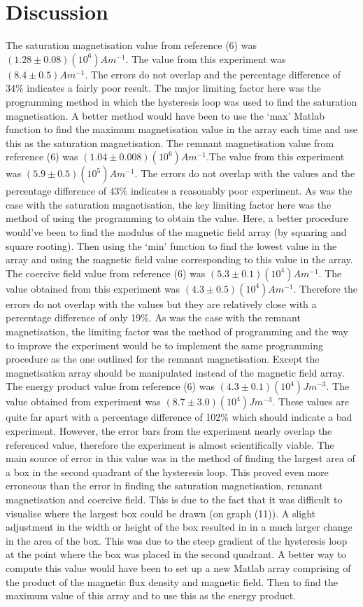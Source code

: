 \documentclass[a4paper]{article}\usepackage[english]{babel}
\begin{document}
\section{Discussion}
The saturation magnetisation value from reference (6) was $(1.28±0.08)(10^6)Am^{-1}$. The value from this experiment was $(8.4±0.5)Am^{-1}$. The errors do not overlap and the percentage difference of 34\% indicates a fairly poor result. The major limiting factor here was the programming method in which the hysteresis loop was used to find the saturation magnetisation. A better method would have been to use the ‘max’ Matlab function to find the maximum magnetisation value in the array each time and use this as the saturation magnetisation.
The remnant magnetisation value from reference (6) was $(1.04±0.008)(10^6)Am^{-1}$.The value from this experiment was $(5.9±0.5)(10^5)Am^{-1}$. The errors do not overlap with the values and the percentage difference of 43\% indicates a reasonably poor experiment. As was the case with the saturation magnetisation, the key limiting factor here was the method of using the programming to obtain the value. Here, a better procedure would’ve been to find the modulus of the magnetic field array (by squaring and square rooting). Then using the ‘min’ function to find the lowest value in the array and using the magnetic field value corresponding to this value in the array. 
The coercive field value from reference (6) was $(5.3±0.1)(10^4)Am^{-1}$. The value obtained from this experiment was $(4.3±0.5)(10^4)Am^{-1}$. Therefore the errors do not overlap with the values but they are relatively close with a percentage difference of only 19\%. As was the case with the remnant magnetisation, the limiting factor was the method of programming and the way to improve the experiment would be to implement the same programming procedure as the one outlined for the remnant magnetisation. Except the magnetisation array should be manipulated instead of the magnetic field array. 
The energy product value from reference (6) was $(4.3±0.1)(10^4)Jm^{-3}$. The value obtained from experiment was $(8.7±3.0)(10^4)Jm^{-3}$. These values are quite far apart with a percentage difference of 102\% which should indicate a bad experiment. However, the error bars from the experiment nearly overlap the referenced value, therefore the experiment is almost scientifically viable. The main source of error in this value was in the method of finding the largest area of a box in the second quadrant of the hysteresis loop. This proved even more erroneous than the error in finding the saturation magnetisation, remnant magnetisation and coercive field. This is due to the fact that it was difficult to visualise where the largest box could be drawn (on graph (11)). A slight adjustment in the width or height of the box resulted in in a much larger change in the area of the box. This was due to the steep gradient of the hysteresis loop at the point where the box was placed in the second quadrant. A better way to compute this value would have been to set up a new Matlab array comprising of the product of the magnetic flux density and magnetic field. Then to find the maximum value of this array and to use this as the energy product.  
\end{document}
